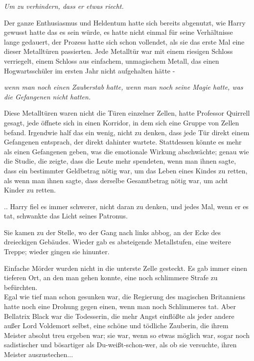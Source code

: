 {\emph{Um zu verhindern, dass er etwas riecht.}

Der ganze Enthusiasmus und Heldentum hatte sich bereits abgenutzt, wie Harry gewusst hatte das es sein würde, es hatte nicht einmal für seine Verhältnisse lange gedauert, der Prozess hatte sich schon vollendet, als sie das erste Mal eine dieser Metalltüren passierten. Jede Metalltür war mit einem riesigen Schloss verriegelt, einem Schloss aus einfachem, unmagischem Metall, das einen Hogwartsschüler im ersten Jahr nicht aufgehalten hätte -

\emph{wenn man noch einen Zauberstab hatte, wenn man noch seine Magie hatte, was die Gefangenen nicht hatten.}

Diese Metalltüren waren nicht die Türen einzelner Zellen, hatte Professor Quirrell gesagt, jede öffnete sich in einen Korridor, in dem sich eine Gruppe von Zellen befand. Irgendwie half das ein wenig, nicht zu denken, dass jede Tür direkt einem Gefangenen entsprach, der direkt dahinter wartete. Stattdessen könnte es mehr als einen Gefangenen geben, was die emotionale Wirkung abschwächte; genau wie die Studie, die zeigte, dass die Leute mehr spendeten, wenn man ihnen sagte, dass ein bestimmter Geldbetrag nötig war, um das Leben eines Kindes zu retten, als wenn man ihnen sagte, dass derselbe Gesamtbetrag nötig war, um acht Kinder zu retten.

.. Harry fiel es immer schwerer, nicht daran zu denken, und jedes Mal, wenn er es tat, schwankte das Licht seines Patronus.

Sie kamen zu der Stelle, wo der Gang nach links abbog, an der Ecke des dreieckigen Gebäudes. Wieder gab es absteigende Metallstufen, eine weitere Treppe; wieder gingen sie hinunter.

Einfache Mörder wurden nicht in die unterste Zelle gesteckt. Es gab immer einen tieferen Ort, an den man gehen konnte, eine noch schlimmere Strafe zu befürchten.\\ Egal wie tief man schon gesunken war, die Regierung des magischen Britanniens hatte noch eine Drohung gegen einen, wenn man noch Schlimmeres tat. Aber Bellatrix Black war die Todesserin, die mehr Angst einflößte als jeder andere außer Lord Voldemort selbst, eine schöne und tödliche Zauberin, die ihrem Meister absolut treu ergeben war; sie war, wenn so etwas möglich war, sogar noch sadistischer und bösartiger als Du-weißt-schon-wer, als ob sie versuchte, ihren Meister auszustechen...

}
